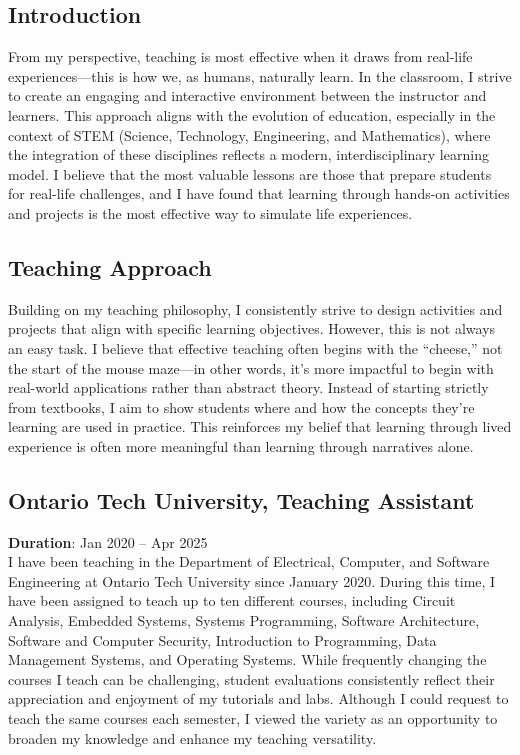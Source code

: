 \documentclass[10pt, letterpaper]{article}
\begin{document}
\subsection*{Introduction}
From my perspective, teaching is most effective when it draws from real-life experiences—this is how we, as humans, naturally learn. In the classroom, I strive to create an engaging and interactive environment between the instructor and learners. This approach aligns with the evolution of education, especially in the context of STEM (Science, Technology, Engineering, and Mathematics), where the integration of these disciplines reflects a modern, interdisciplinary learning model. I believe that the most valuable lessons are those that prepare students for real-life challenges, and I have found that learning through hands-on activities and projects is the most effective way to simulate life experiences.


\subsection*{Teaching Approach}
Building on my teaching philosophy, I consistently strive to design activities and projects that align with specific learning objectives. However, this is not always an easy task. I believe that effective teaching often begins with the “cheese,” not the start of the mouse maze—in other words, it’s more impactful to begin with real-world applications rather than abstract theory. Instead of starting strictly from textbooks, I aim to show students where and how the concepts they’re learning are used in practice. This reinforces my belief that learning through lived experience is often more meaningful than learning through narratives alone.

\subsection*{Ontario Tech University, Teaching Assistant}
\textbf{Duration}: Jan 2020 – Apr 2025 \\
I have been teaching in the Department of Electrical, Computer, and Software Engineering at Ontario Tech University since January 2020. During this time, I have been assigned to teach up to ten different courses, including Circuit Analysis, Embedded Systems, Systems Programming, Software Architecture, Software and Computer Security, Introduction to Programming, Data Management Systems, and Operating Systems. While frequently changing the courses I teach can be challenging, student evaluations consistently reflect their appreciation and enjoyment of my tutorials and labs. Although I could request to teach the same courses each semester, I viewed the variety as an opportunity to broaden my knowledge and enhance my teaching versatility.
\vspace{0.2cm}
\end{document}
